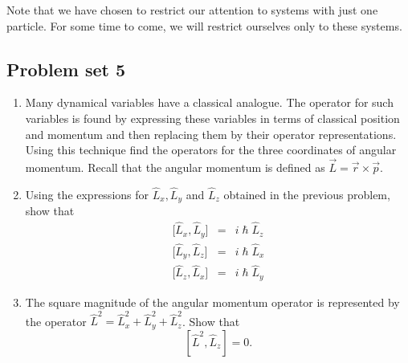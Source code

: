 Note that we have chosen to restrict our attention to systems with just one
particle. For some time to come, we will restrict ourselves only to these 
systems.

\subsection{Problem set 5}
\begin{enumerate}
\item Many dynamical variables have a classical analogue. The operator for such
variables is found by expressing these variables in terms of classical position
and momentum and then replacing them by their operator representations. Using 
this technique find the operators for the three coordinates of angular momentum.
Recall that the angular momentum is defined as $\vec{L}=\vec{r}\times\vec{p}$.
\item Using the expressions for $\hat{L}_x, \hat{L}_y$ and $\hat{L}_z$ obtained
in the previous problem, show that
\begin{eqnarray}
{[}\hat{L}_x, \hat{L}_y] &=& i\hslash \hat{L}_z \label{c4s4e3} \\
{[}\hat{L}_y, \hat{L}_z] &=& i\hslash \hat{L}_x \label{c4s4e4} \\
{[}\hat{L}_z, \hat{L}_x] &=& i\hslash \hat{L}_y \label{c4s4e5}
\end{eqnarray}
\item The square magnitude of the angular momentum operator is represented by 
the operator $\hat{L}^2 = \hat{L}_x^2 + \hat{L}_y^2 + \hat{L}_z^2$. Show that
\begin{equation}\label{c4s4e6}
[\hat{L}^2, \hat{L}_z] = 0.
\end{equation}
\end{enumerate}

